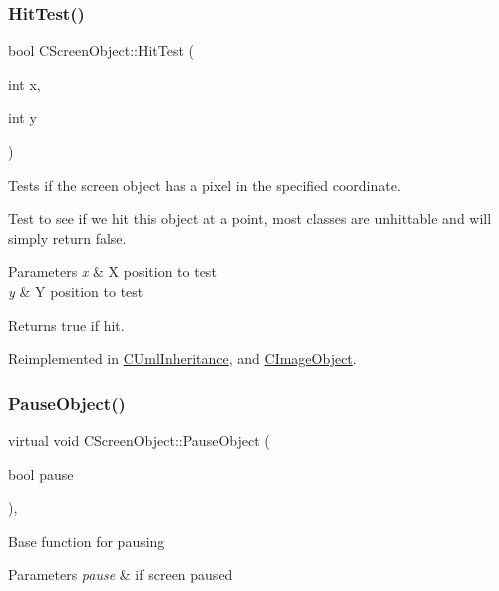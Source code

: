 \subsubsection{\texorpdfstring{HitTest()}{HitTest()}}
{\footnotesize\ttfamily bool C\+Screen\+Object\+::\+Hit\+Test (\begin{DoxyParamCaption}\item[{int}]{x,  }\item[{int}]{y }\end{DoxyParamCaption})\hspace{0.3cm}{\ttfamily [virtual]}}



Tests if the screen object has a pixel in the specified coordinate. 

Test to see if we hit this object at a point, most classes are unhittable and will simply return false. 
\begin{DoxyParams}{Parameters}
{\em x} & X position to test \\
\hline
{\em y} & Y position to test \\
\hline
\end{DoxyParams}
\begin{DoxyReturn}{Returns}
true if hit. 
\end{DoxyReturn}


Reimplemented in \mbox{\hyperlink{class_c_uml_inheritance_a2ea7bb7da84ad2e16bdc7a1ba44985a1}{C\+Uml\+Inheritance}}, and \mbox{\hyperlink{class_c_image_object_a0b8db07f55fa820b3683d2a99d553120}{C\+Image\+Object}}.

\mbox{\label{class_c_screen_object_a584fe08e6bdd9efe0c2f06d6f1d53e70}} 
\subsubsection{\texorpdfstring{PauseObject()}{PauseObject()}}
{\footnotesize\ttfamily virtual void C\+Screen\+Object\+::\+Pause\+Object (\begin{DoxyParamCaption}\item[{bool}]{pause }\end{DoxyParamCaption})\hspace{0.3cm}{\ttfamily [inline]}, {\ttfamily [virtual]}}

Base function for pausing 
\begin{DoxyParams}{Parameters}
{\em pause} & if screen paused \\
\hline
\end{DoxyParams}


